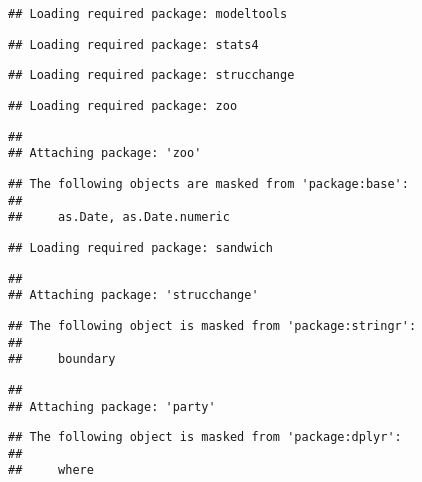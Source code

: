 \documentclass[
]{article}
\newenvironment{Shaded}{\begin{snugshade}}{\end{snugshade}}
\newcommand{\AttributeTok}[1]{\textcolor[rgb]{0.13,0.29,0.53}{#1}}
\newcommand{\CommentTok}[1]{\textcolor[rgb]{0.56,0.35,0.01}{\textit{#1}}}
\newcommand{\FunctionTok}[1]{\textcolor[rgb]{0.13,0.29,0.53}{\textbf{#1}}}
\newcommand{\NormalTok}[1]{#1}
\newcommand{\OtherTok}[1]{\textcolor[rgb]{0.56,0.35,0.01}{#1}}
\newcommand{\SpecialCharTok}[1]{\textcolor[rgb]{0.81,0.36,0.00}{\textbf{#1}}}
\newcommand{\StringTok}[1]{\textcolor[rgb]{0.31,0.60,0.02}{#1}}
\begin{document}
\begin{verbatim}
## Loading required package: modeltools
\end{verbatim}

\begin{verbatim}
## Loading required package: stats4
\end{verbatim}

\begin{verbatim}
## Loading required package: strucchange
\end{verbatim}

\begin{verbatim}
## Loading required package: zoo
\end{verbatim}

\begin{verbatim}
## 
## Attaching package: 'zoo'
\end{verbatim}

\begin{verbatim}
## The following objects are masked from 'package:base':
## 
##     as.Date, as.Date.numeric
\end{verbatim}

\begin{verbatim}
## Loading required package: sandwich
\end{verbatim}

\begin{verbatim}
## 
## Attaching package: 'strucchange'
\end{verbatim}

\begin{verbatim}
## The following object is masked from 'package:stringr':
## 
##     boundary
\end{verbatim}

\begin{verbatim}
## 
## Attaching package: 'party'
\end{verbatim}

\begin{verbatim}
## The following object is masked from 'package:dplyr':
## 
##     where
\end{verbatim}

\begin{Shaded}
\end{Shaded}
\end{document}
